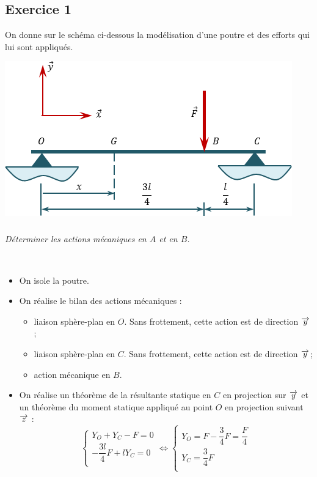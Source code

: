 \documentclass[10pt,fleqn]{article} %
\begin{document}
\begin{multicols}{2}





\newpage



\section*{Exercice 1}
\setcounter{subparagraph}{0}
On donne sur le schéma ci-dessous la modélisation d'une poutre et des efforts qui lui sont appliqués.
\begin{center}
\includegraphics[width=.45\textwidth]{images/exo_01}
\end{center}

\subparagraph{}
\textit{Déterminer les actions mécaniques en $A$ et en $B$.}
\ifprof
\begin{corrige}~\\

\begin{itemize}[label=,font=\color{ocre}] 
\item On isole la poutre.
\item On réalise le bilan des actions mécaniques :
\begin{itemize}[label=,font=\color{ocre} \footnotesize] 
\item liaison sphère-plan en $O$. Sans frottement, cette action est de direction $\overrightarrow{y}$;
\item liaison sphère-plan en $C$. Sans frottement, cette action est de direction $\overrightarrow{y}$;
\item action mécanique en $B$.
\end{itemize}
\item On réalise un théorème de la résultante statique en $C$ en projection sur $\overrightarrow{y}$ et un théorème du moment statique appliqué au point $O$ en projection suivant $\overrightarrow{z}$ :
$$
\left\{
\begin{array}{l}
Y_O + Y_C -F = 0 \\
-\dfrac{3l}{4}F + l Y_C = 0 \\
\end{array}
\right.
\Leftrightarrow
\left\{
\begin{array}{l}
Y_O = F -  \dfrac{3}{4}F  = \dfrac{F}{4} \\
Y_C = \dfrac{3}{4}F \\
\end{array}
\right.
$$
\end{itemize}


\end{corrige}
\end{multicols}
\end{document}

